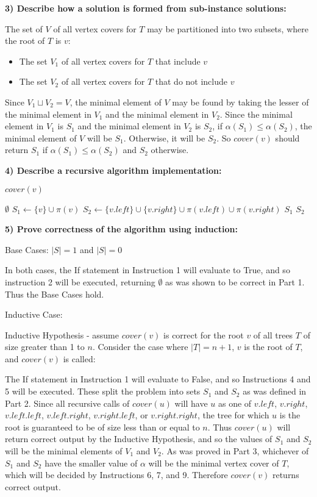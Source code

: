 \documentclass{article}
\begin{document}
\textbf{3) Describe how a solution is formed from sub-instance solutions:}

The set of $V$ of all vertex covers for $T$ may be partitioned into two
subsets, where the root of $T$ is $v$:
\begin{itemize}
\item The set $V_1$ of all vertex covers for $T$ that include $v$
\item The set $V_2$ of all vertex covers for $T$ that do not include $v$
\end{itemize}
Since $V_1 \sqcup V_2 = V$, the minimal element of $V$ may be found by taking
the lesser of the minimal element in $V_1$ and the minimal element in $V_2$.
Since the minimal element in $V_1$ is $S_1$ and the minimal element in $V_2$ is
$S_2$, if $\alpha(S_1) \leq \alpha(S_2)$, the minimal element of $V$ will be
$S_1$. Otherwise, it will be $S_2$. So $cover(v)$ should return $S_1$ if
$\alpha(S_1) \leq \alpha(S_2)$ and $S_2$ otherwise.

\textbf{4) Describe a recursive algorithm implementation:}

$cover(v)$
\begin{algorithmic}[1]
	\RETURN $\emptyset$
\ELSE
	\STATE $S_1\gets\{v\}\cup\pi(v)$
	\STATE $S_2\gets\{v.left\}\cup\{v.right\}\cup\pi(v.left)\cup\pi(v.right)$
		\RETURN $S_1$
	\ELSE
		\RETURN $S_2$
	\ENDIF
\ENDIF
\end{algorithmic}

\textbf{5) Prove correctness of the algorithm using induction:}

Base Cases: $|S|=1$ and $|S|=0$

In both cases, the If statement in Instruction 1 will evaluate to True, and so
instruction 2 will be executed, returning $\emptyset$ as was shown to be
correct in Part 1. Thus the Base Cases hold.

Inductive Case:

Inductive Hypothesis - assume $cover(v)$ is correct for the root $v$ of all
trees $T$ of size greater than 1 to $n$. Consider the case where $|T|=n+1$, $v$
is the root of $T$, and $cover(v)$ is called:

The If statement in Instruction 1 will evaluate to False, and so Instructions 4
and 5 will be executed. These split the problem into sets $S_1$ and $S_2$ as
was defined in Part 2. Since all recursive calls of $cover(u)$ will have $u$ as
one of $v.left$, $v.right$, $v.left.left$, $v.left.right$, $v.right.left$, or
$v.right.right$, the tree for which $u$ is the root is guaranteed to be of size
less than or equal to $n$. Thus $cover(u)$ will return correct output by the
Inductive Hypothesis, and so the values of $S_1$ and $S_2$ will be the minimal
elements of $V_1$ and $V_2$. As was proved in Part 3, whichever of $S_1$ and
$S_2$ have the smaller value of $\alpha$ will be the minimal vertex cover of
$T$, which will be decided by Instructions 6, 7, and 9. Therefore $cover(v)$
returns correct output.
\end{document}
